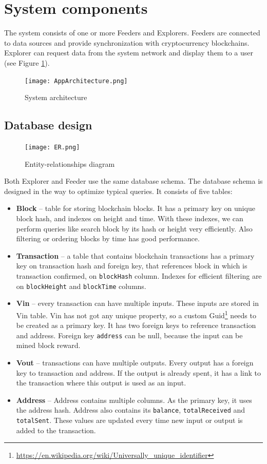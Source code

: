 \section{System components}
The system consists of one or more Feeders and Explorers. Feeders are connected to data sources and provide synchronization with cryptocurrency blockchains. Explorer can request data from the system network and display them to a user (see Figure \ref{systemArchitecture}).

\begin{figure}[h]
    \centering
    \texttt{[image: AppArchitecture.png]}
    \caption{System architecture}
    \label{systemArchitecture}
\end{figure}

\subsection{Database design}
\label{design}

\begin{figure}[h]
    \centering
    \texttt{[image: ER.png]}
    \caption{Entity-relationships diagram}
    \label{er}
\end{figure}

Both Explorer and Feeder use the same database schema. The database schema is designed in the way to optimize typical queries. It consists of five tables:
\begin{itemize}
    \item \textbf{Block} -- table for storing blockchain blocks. It has a primary key on unique block hash, and indexes on height and time. With these indexes, we can perform queries like search block by its hash or height very efficiently. Also filtering or ordering blocks by time has good performance.
    \item \textbf{Transaction} -- a table that contains blockchain transactions has a primary key on transaction hash and foreign key, that references block in which is transaction confirmed, on \texttt{blockHash} column. Indexes for efficient filtering are on \texttt{blockHeight} and \texttt{blockTime} columns. 
    \item \textbf{Vin} -- every transaction can have multiple inputs. These inputs are stored in Vin table. Vin has not got any unique property, so a custom Guid\footnote{\url{https://en.wikipedia.org/wiki/Universally_unique_identifier}} needs to be created as a primary key. It has two foreign keys to reference transaction and address. Foreign key \texttt{address} can be null, because the input can be mined block reward.
    \item \textbf{Vout} -- transactions can have multiple outputs. Every output has a foreign key to transaction and address. If the output is already spent, it has a link to the transaction where this output is used as an input.
    \item \textbf{Address} -- Address contains multiple columns. As the primary key, it uses the address hash. Address also contains its \texttt{balance}, \texttt{totalReceived} and \texttt{totalSent}. These values are updated every time new input or output is added to the transaction.  
\end{itemize}



